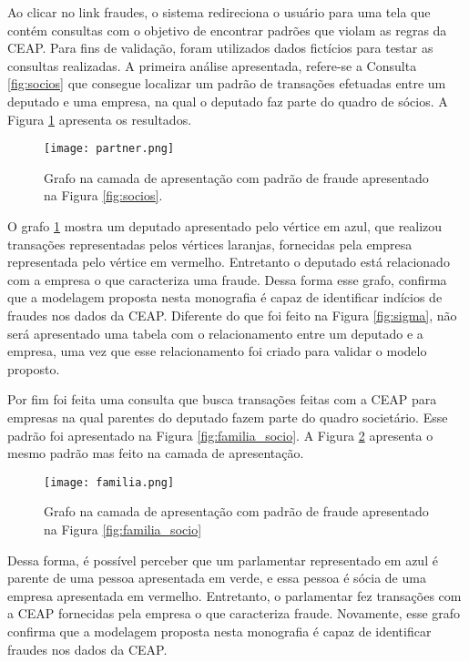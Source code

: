 Ao clicar no link fraudes, o sistema redireciona o usuário para uma tela que contém consultas com o objetivo de encontrar padrões que violam as regras da CEAP. Para fins de validação, foram utilizados dados fictícios para testar as consultas realizadas. A primeira análise apresentada, refere-se a Consulta \ref{fig:socios} que consegue localizar um padrão de transações efetuadas entre um deputado e uma empresa, na qual o deputado faz parte do quadro de sócios. A Figura \ref{fig:partner} apresenta os resultados.

\begin{figure}[H]
\centering
\texttt{[image: partner.png]}
\caption{Grafo na camada de apresentação com padrão de fraude apresentado na Figura \ref{fig:socios}.}
\label{fig:partner}
\end{figure}

O grafo \ref{fig:partner} mostra um deputado apresentado pelo vértice em azul, que realizou transações representadas pelos vértices laranjas, fornecidas pela empresa representada pelo vértice em vermelho. Entretanto o deputado está relacionado com a empresa o que caracteriza uma fraude. Dessa forma esse grafo, confirma que a modelagem proposta nesta monografia é capaz de identificar indícios de fraudes nos dados da CEAP. Diferente do que foi feito na Figura \ref{fig:sigma}, não será apresentado uma tabela com o relacionamento entre um deputado e a empresa, uma vez que esse relacionamento foi criado para validar o modelo proposto.

Por fim foi feita uma consulta que busca transações feitas com a CEAP para empresas na qual parentes do deputado fazem parte do quadro societário. Esse padrão foi apresentado na Figura \ref{fig:familia_socio}. A Figura \ref{fig:familia_grafo} apresenta o mesmo padrão mas feito na camada de apresentação.

\begin{figure}[H]
\centering
\texttt{[image: familia.png]}
\caption{Grafo na camada de apresentação com padrão de fraude apresentado na Figura \ref{fig:familia_socio}}
\label{fig:familia_grafo}
\end{figure}

Dessa forma, é possível perceber que um parlamentar representado em azul é parente de uma pessoa apresentada em verde, e essa pessoa é sócia de uma empresa apresentada em vermelho. Entretanto, o parlamentar fez transações com a CEAP fornecidas pela empresa o que caracteriza fraude. Novamente, esse grafo confirma que a modelagem proposta nesta monografia é capaz de identificar fraudes nos dados da CEAP. 